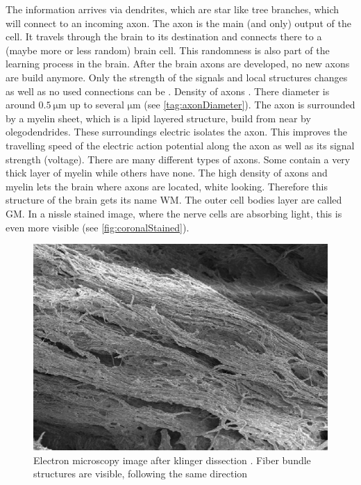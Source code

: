 The information arrives via dendrites, which are star like tree branches, which will connect to an incoming axon.
The axon is the main (and only) output of the cell.
It travels through the brain to its destination and connects there to a (maybe more or less random) brain cell.
This randomness is also part of the learning process in the brain.
After the brain axons are developed, no new axons are build anymore.
Only the strength of the signals and local structures changes as well as no used connections can be .
Density of axons \dummy{}.
There diameter is around $\SI{0.5}{\micro\meter}$ up to several $\si{\micro\meter}$ (see \cref{tag:axonDiameter}).
The axon is surrounded by a myelin sheet, which is a lipid layered structure, build from near by olegodendrides.
These surroundings electric isolates the axon.
This improves the travelling speed of the electric action potential along the axon as well as its signal strength (voltage).
There are many different types of axons.
Some contain a very thick layer of myelin while others have none.
The high density of axons and myelin lets the brain where axons are located, white looking.
Therefore this structure of the brain gets its name \ac{WM}.
The outer cell bodies layer are called \ac{GM}.
In a nissle stained image, where the nerve cells are absorbing light, this is even more visible (see \cref{fig:coronalStained}).
\par
% 
\begin{figure}[!t]
	\centering
	\includegraphics{gfx/neuroanatomy/human_wm_after_klinger_dissection.png}
	\caption{Electron microscopy image after klinger dissection \cite{destrieux:hal-01261930}. Fiber bundle structures are visible, following the same direction}
\end{figure}
